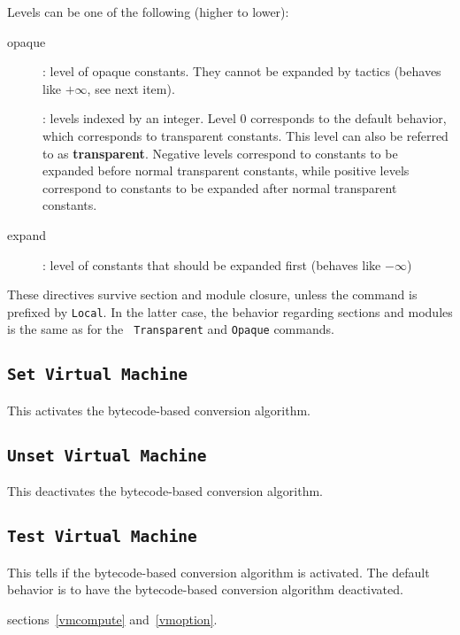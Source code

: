 Levels can be one of the following (higher to lower):
\begin{description}
\item[opaque]: level of opaque constants. They cannot be expanded by
  tactics (behaves like $+\infty$, see next item).
\item[\num]: levels indexed by an integer. Level $0$ corresponds
  to the default behavior, which corresponds to transparent
  constants. This level can also be referred to as {\bf transparent}.
  Negative levels correspond to constants to be expanded before normal
  transparent constants, while positive levels correspond to constants
  to be expanded after normal transparent constants.
\item[expand]: level of constants that should be expanded first
  (behaves like $-\infty$)
\end{description}

These directives survive section and module closure, unless the
command is prefixed by {\tt Local}. In the latter case, the behavior
regarding sections and modules is the same as for the {\tt
  Transparent} and {\tt Opaque} commands.

\subsection{\tt Set Virtual Machine
\label{SetVirtualMachine}
}

This activates the bytecode-based conversion algorithm.

\subsection{\tt Unset Virtual Machine
}

This deactivates the bytecode-based conversion algorithm.

\subsection{\tt Test Virtual Machine
}

This tells if the bytecode-based conversion algorithm is
activated. The default behavior is to have the bytecode-based
conversion algorithm deactivated.

\SeeAlso sections~\ref{vmcompute} and~\ref{vmoption}.


